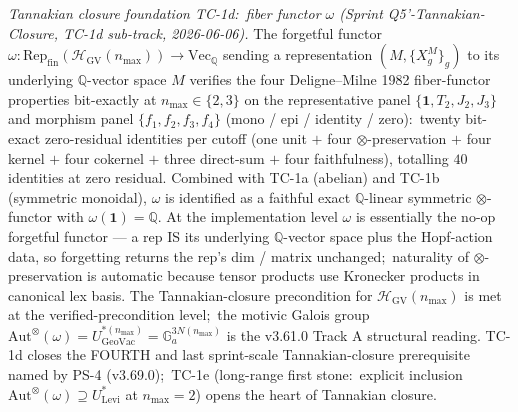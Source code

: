 \documentclass[11pt,a4paper]{article}
\theoremstyle{plain}
\theoremstyle{definition}
\begin{document}
\emph{Tannakian closure foundation TC-1d:\ fiber functor $\omega$
(Sprint Q5'-Tannakian-Closure, TC-1d sub-track, 2026-06-06).}
The forgetful functor $\omega:
\mathrm{Rep}_{\mathrm{fin}}(\mathcal{H}_{\mathrm{GV}}(n_{\max}))
\to \mathrm{Vec}_\mathbb{Q}$ sending a representation
$(M, \{X_g^M\}_g)$ to its underlying $\mathbb{Q}$-vector space $M$
verifies the four Deligne--Milne 1982 fiber-functor properties
bit-exactly at $n_{\max} \in \{2, 3\}$ on the representative panel
$\{\mathbf{1}, T_2, J_2, J_3\}$ and morphism panel
$\{f_1, f_2, f_3, f_4\}$ (mono / epi / identity / zero):\ twenty
bit-exact zero-residual identities per cutoff (one unit $+$ four
$\otimes$-preservation $+$ four kernel $+$ four cokernel $+$ three
direct-sum $+$ four faithfulness), totalling $40$ identities at
zero residual.  Combined with TC-1a (abelian) and TC-1b (symmetric
monoidal), $\omega$ is identified as a faithful exact
$\mathbb{Q}$-linear symmetric $\otimes$-functor with
$\omega(\mathbf{1}) = \mathbb{Q}$.  At the implementation level
$\omega$ is essentially the no-op forgetful functor — a rep IS its
underlying $\mathbb{Q}$-vector space plus the Hopf-action data, so
forgetting returns the rep's dim / matrix unchanged;\ naturality of
$\otimes$-preservation is automatic because tensor products use
Kronecker products in canonical lex basis.  The
Tannakian-closure precondition for
$\mathcal{H}_{\mathrm{GV}}(n_{\max})$ is met at the
verified-precondition level;\ the motivic Galois group
$\mathrm{Aut}^\otimes(\omega) = U^{*(n_{\max})}_{\mathrm{GeoVac}}
= \mathbb{G}_a^{3 N(n_{\max})}$ is the v3.61.0 Track A structural
reading.  TC-1d closes the FOURTH and last sprint-scale
Tannakian-closure prerequisite named by PS-4 (v3.69.0);\ TC-1e
(long-range first stone:\ explicit inclusion
$\mathrm{Aut}^\otimes(\omega) \supseteq U^\ast_{\mathrm{Levi}}$
at $n_{\max} = 2$) opens the heart of Tannakian closure.
\end{document}
